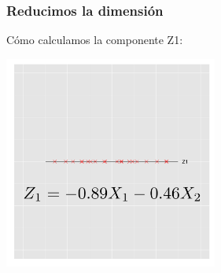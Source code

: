 \documentclass{beamer}
\begin{document}
  \begin{frame}\frametitle{Reducimos la dimensión}
  Cómo calculamos la componente Z1:
 \begin{center}
   \includegraphics[height=7cm]{reduccion2d1d_expresion_z1.png}
 \end{center}
  \end{frame}
\end{document}
